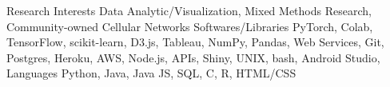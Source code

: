 

\begin{cvskills}
  \cvskill
    {Research Interests} %
    {Data Analytic/Visualization, Mixed Methods Research, Community-owned Cellular Networks} %
  \cvskill
    {Softwares/Libraries} %
    {PyTorch, Colab, TensorFlow, scikit-learn, D3.js, Tableau, NumPy, Pandas, Web Services, } %
  \cvskill
    {} %
    {Git, Postgres, Heroku, AWS, Node.js, APIs, Shiny, UNIX, bash, Android Studio,  } %
  \cvskill
    {Languages} %
    {Python, Java, Java JS, SQL, C, R, HTML/CSS} %
\end{cvskills}